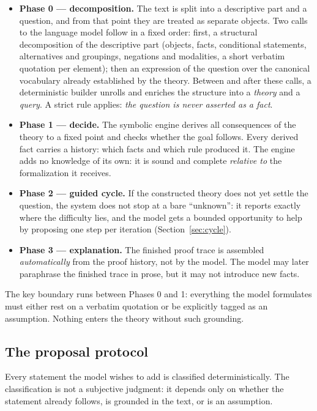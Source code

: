 \documentclass[11pt,a4paper]{article}
\begin{document}
\begin{itemize}
\item \textbf{Phase 0 --- decomposition.} The text is split into a descriptive part and a
question, and from that point they are treated as separate objects. Two calls to the
language model follow in a fixed order: first, a structural decomposition of the descriptive
part (objects, facts, conditional statements, alternatives and groupings, negations and
modalities, a short verbatim quotation per element); then an expression of the question over
the canonical vocabulary already established by the theory. Between and after these calls, a
deterministic builder unrolls and enriches the structure into a \emph{theory} and a
\emph{query}. A strict rule applies: \emph{the question is never asserted as a fact}.
\item \textbf{Phase 1 --- decide.} The symbolic engine derives all consequences of the
theory to a fixed point and checks whether the goal follows. Every derived fact carries a
history: which facts and which rule produced it. The engine adds no knowledge of its own: it
is sound and complete \emph{relative to} the formalization it receives.
\item \textbf{Phase 2 --- guided cycle.} If the constructed theory does not yet settle the
question, the system does not stop at a bare ``unknown'': it reports exactly where the
difficulty lies, and the model gets a bounded opportunity to help by proposing one step per
iteration (Section~\ref{sec:cycle}).
\item \textbf{Phase 3 --- explanation.} The finished proof trace is assembled
\emph{automatically} from the proof history, not by the model. The model may later
paraphrase the finished trace in prose, but it may not introduce new facts.
\end{itemize}

The key boundary runs between Phases 0 and 1: everything the model formulates must either
rest on a verbatim quotation or be explicitly tagged as an assumption. Nothing enters the
theory without such grounding.

\subsection{The proposal protocol}

Every statement the model wishes to add is classified deterministically. The classification
is not a subjective judgment: it depends only on whether the statement already follows, is
grounded in the text, or is an assumption.
\end{document}
